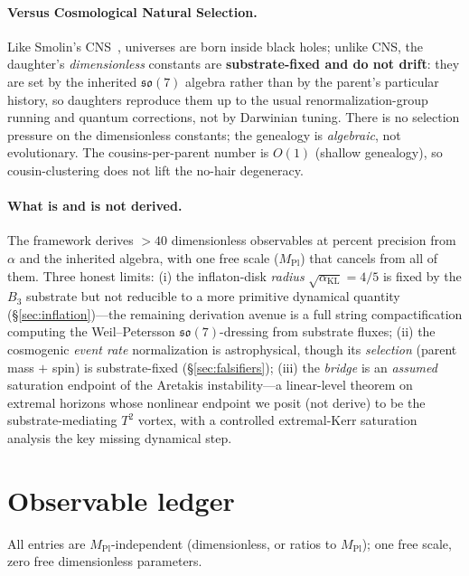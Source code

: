\documentclass[11pt]{article}
\newcommand{\so}{\mathfrak{so}}
\newcommand{\Mpl}{M_{\mathrm{Pl}}}
\begin{document}
\paragraph{Versus Cosmological Natural Selection.} Like Smolin's CNS~\cite{Smolin1992}, universes are born inside black holes; unlike CNS, the daughter's \emph{dimensionless} constants are \textbf{substrate-fixed and do not drift}: they are set by the inherited $\so(7)$ algebra rather than by the parent's particular history, so daughters reproduce them up to the usual renormalization-group running and quantum corrections, not by Darwinian tuning. There is no selection pressure on the dimensionless constants; the genealogy is \emph{algebraic}, not evolutionary. The cousins-per-parent number is $O(1)$ (shallow genealogy), so cousin-clustering does not lift the no-hair degeneracy.

\paragraph{What is and is not derived.} The framework derives $>40$ dimensionless observables at percent precision from $\alpha$ and the inherited algebra, with one free scale ($\Mpl$) that cancels from all of them. Three honest limits: (i) the inflaton-disk \emph{radius} $\sqrt{\alpha_{\mathrm{KL}}} = 4/5$ is fixed by the $B_3$ substrate but not reducible to a more primitive dynamical quantity (\S\ref{sec:inflation})---the remaining derivation avenue is a full string compactification computing the Weil--Petersson $\so(7)$-dressing from substrate fluxes; (ii) the cosmogenic \emph{event rate} normalization is astrophysical, though its \emph{selection} (parent mass $+$ spin) is substrate-fixed (\S\ref{sec:falsifiers}); (iii) the \emph{bridge} is an \emph{assumed} saturation endpoint of the Aretakis instability---a linear-level theorem on extremal horizons whose nonlinear endpoint we posit (not derive) to be the substrate-mediating $T^2$ vortex, with a controlled extremal-Kerr saturation analysis the key missing dynamical step.

\section{Observable ledger}
\label{sec:ledger}

All entries are $\Mpl$-independent (dimensionless, or ratios to $\Mpl$); one free scale, zero free dimensionless parameters.
\end{document}
